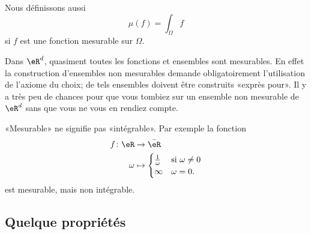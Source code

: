 Nous définissons aussi
\begin{equation}
    \mu(f)=\int_{\Omega}f
\end{equation}
si \( f\) est une fonction mesurable sur \( \Omega\).

\begin{remark}
    Dans \( \eR^d\), quasiment toutes les fonctions et ensembles sont mesurables. En effet la construction d'ensembles non mesurables demande obligatoirement l'utilisation de l'axiome du choix; de tels ensembles doivent être construits «exprès pour». Il y a très peu de chances pour que vous tombiez sur un ensemble non mesurable de \( \eR^d\) sans que vous ne vous en rendiez compte.
\end{remark}

\begin{remark}
    «Mesurable» ne signifie pas «intégrable». Par exemple la fonction 
    \begin{equation}
        \begin{aligned}
            f\colon \eR&\to \bar\eR \\
            \omega&\mapsto\begin{cases}
            \frac{1}{ \omega }    &   \text{si $ \omega\neq 0$}\\
            \infty    &    \text{$\omega=0$}.
            \end{cases}
        \end{aligned}
    \end{equation}
    est mesurable, mais non intégrable.
\end{remark}

\subsection{Quelque propriétés}

